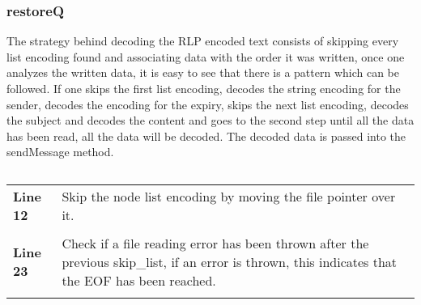 \documentclass[a4paper, 12pt, titlepage]{article}
\newenvironment{code}{\captionsetup{type=listing}}{}
\newcommand{\sourcecode}[3]{
    \begin{code}
      \inputminted[linenos,numbersep=5pt,gobble=0,frame=lines,framesep=2mm,]{c}{#1}
        \caption{#2}
        \label{lst: #3}
    \end{code}
}
\begin{document}
\begin{onehalfspacing}
   \clearpage

   \subsubsection{restoreQ}
   The strategy behind decoding the RLP encoded text consists of skipping every list encoding found and associating data with the order it was written, once one analyzes the written data, it is easy to see that there is a pattern which can be followed. If one skips the first list encoding, decodes the string encoding for the sender, decodes the encoding for the expiry, skips the next list encoding, decodes the subject and decodes the content and goes to the second step until all the data has been read, all the data will be decoded. The decoded data is passed into the sendMessage method.

   \sourcecode{snippets/task2b/restoreQ.c}{restoreQ method implementation}{task2b_restoreQ}
   \begin{longtable}{l p{10cm}}
     \textbf{Line 12} & Skip the node list encoding by moving the file pointer over it. \\ \\
     \textbf{Line 23} & Check if a file reading error has been thrown after the previous skip\_list, if an error is thrown, this indicates that the EOF has been reached. \\ \\
   \end{longtable}


\end{onehalfspacing}
\end{document}
